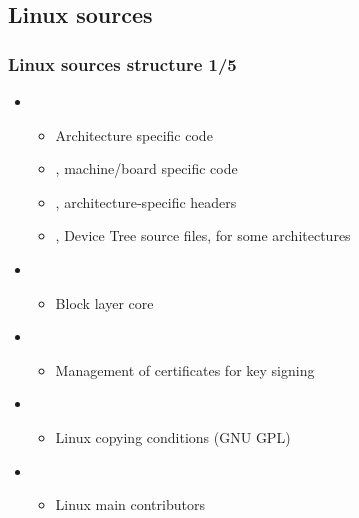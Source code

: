 \subsection{Linux sources}

\begin{frame}
  \frametitle{Linux sources structure 1/5}
  \begin{itemize}
  \item {}
    \begin{itemize}
    \item Architecture specific code
    \item {}, machine/board
      specific code
    \item {}, architecture-specific
      headers
    \item {}, Device Tree source files, for
      some architectures
    \end{itemize}
  \item {}
    \begin{itemize}
    \item Block layer core
    \end{itemize}
  \item {}
    \begin{itemize}
    \item Management of certificates for key signing
    \end{itemize}
  \item {}
    \begin{itemize}
    \item Linux copying conditions (GNU GPL)
    \end{itemize}
  \item {}
    \begin{itemize}
    \item Linux main contributors
    \end{itemize}
  \end{itemize}
\end{frame}

